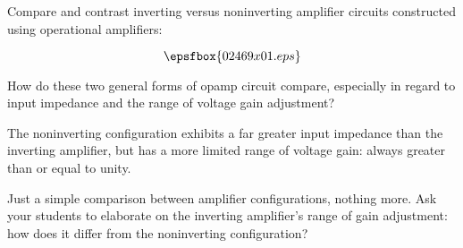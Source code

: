 

Compare and contrast inverting versus noninverting amplifier circuits constructed using operational amplifiers:

$$\epsfbox{02469x01.eps}$$

How do these two general forms of opamp circuit compare, especially in regard to input impedance and the range of voltage gain adjustment?







The noninverting configuration exhibits a far greater input impedance than the inverting amplifier, but has a more limited range of voltage gain: always greater than or equal to unity.







Just a simple comparison between amplifier configurations, nothing more.  Ask your students to elaborate on the inverting amplifier's range of gain adjustment: how does it differ from the noninverting configuration?




